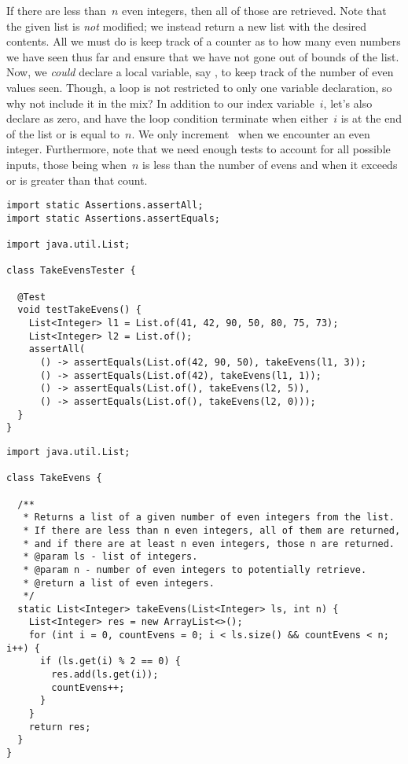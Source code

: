 If there are less than~$n$ even integers, then all of those are retrieved.
Note that the given list is \emph{not} modified; we instead return a new list with the desired contents.
All we must do is keep track of a counter as to how many even numbers we have seen thus far and ensure that we have not gone out of bounds of the list.
Now, we \emph{could} declare a local variable, say , to keep track of the number of even values seen. 
Though, a  loop is not restricted to only one variable declaration, so why not include it in the mix?
In addition to our index variable~$i$, let's also declare  as zero, and have the loop condition terminate when either~$i$ is at the end of the list or  is equal to~$n$.
We only increment~ when we encounter an even integer.
Furthermore, note that we need enough tests to account for all possible inputs, those being when~$n$ is less than the number of evens and when it exceeds or is greater than that count.

\begin{lstlisting}[language=MyJava]
import static Assertions.assertAll;
import static Assertions.assertEquals;

import java.util.List;

class TakeEvensTester {

  @Test
  void testTakeEvens() {
    List<Integer> l1 = List.of(41, 42, 90, 50, 80, 75, 73);
    List<Integer> l2 = List.of();
    assertAll(
      () -> assertEquals(List.of(42, 90, 50), takeEvens(l1, 3));
      () -> assertEquals(List.of(42), takeEvens(l1, 1));
      () -> assertEquals(List.of(), takeEvens(l2, 5)),
      () -> assertEquals(List.of(), takeEvens(l2, 0)));
  }
}
\end{lstlisting}

\begin{lstlisting}[language=MyJava]
import java.util.List;

class TakeEvens {

  /**
   * Returns a list of a given number of even integers from the list.
   * If there are less than n even integers, all of them are returned,
   * and if there are at least n even integers, those n are returned.
   * @param ls - list of integers.
   * @param n - number of even integers to potentially retrieve.
   * @return a list of even integers.
   */
  static List<Integer> takeEvens(List<Integer> ls, int n) {
    List<Integer> res = new ArrayList<>();
    for (int i = 0, countEvens = 0; i < ls.size() && countEvens < n; i++) {
      if (ls.get(i) % 2 == 0) {
        res.add(ls.get(i));
        countEvens++;
      }
    }
    return res;
  }
}
\end{lstlisting}

